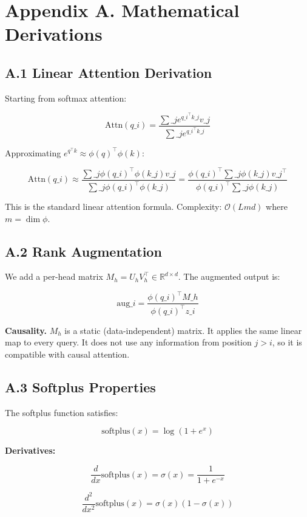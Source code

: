 
\section{Appendix A. Mathematical Derivations}

\subsection{A.1 Linear Attention Derivation}

Starting from softmax attention:

\[
\text{Attn}(q\_i) = \frac{\sum\_j e^{q\_i^\top k\_j} v\_j}{\sum\_j e^{q\_i^\top k\_j}}
\tag{A.1}
\]

Approximating $e^{q^\top k} \approx \phi(q)^\top \phi(k)$:

\[
\text{Attn}(q\_i) \approx \frac{\sum\_j \phi(q\_i)^\top \phi(k\_j) v\_j}{\sum\_j \phi(q\_i)^\top \phi(k\_j)}
= \frac{\phi(q\_i)^\top \sum\_j \phi(k\_j) v\_j^\top}{\phi(q\_i)^\top \sum\_j \phi(k\_j)}
\tag{A.2}
\]

This is the standard linear attention formula. Complexity: $\mathcal{O}(L m d)$ 
where $m = \dim \phi$.

\subsection{A.2 Rank Augmentation}

We add a per-head matrix $M_h = U_h V_h^\top \in \mathbb{R}^{d \times d}$. 
The augmented output is:

\[
\text{aug}\_i = \frac{\phi(q\_i)^\top M\_h}{\phi(q\_i)^\top z\_i}
\tag{A.3}
\]

\textbf{Causality.} $M_h$ is a static (data-independent) matrix. It applies the 
same linear map to every query. It does not use any information from position 
$j > i$, so it is compatible with causal attention.

\subsection{A.3 Softplus Properties}

The softplus function satisfies:

\[
\text{softplus}(x) = \log(1 + e^x)
\tag{A.4}
\]

\textbf{Derivatives:}

\[
\frac{d}{dx}\text{softplus}(x) = \sigma(x) = \frac{1}{1 + e^{-x}}
\tag{A.5}
\]

\[
\frac{d^2}{dx^2}\text{softplus}(x) = \sigma(x)(1 - \sigma(x))
\tag{A.6}
\]

